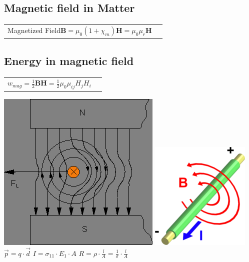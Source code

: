 		\subsection{Magnetic field in Matter}
		\begin{tabularx}{\columnwidth}{lX}
			Magnetized Field$\mathbf{B} = \mu_0(1+ \chi_m)\mathbf{H} =  \mu_0\mu_r\mathbf{H}$			
		\end{tabularx}
		
		\subsection{Energy in magnetic field}
		\begin{tabularx}{\columnwidth}{lX}
			$w_{mag} = \frac{1}{2}\mathbf{BH}= \frac{1}{2}\mu_0\mu_{ij}H_j H_i$\\
		\end{tabularx}

				\includegraphics[scale=0.5]{images/DrahtZwischenPolen.png}
				\includegraphics[scale=0.5]{images/B-Feld.png}
			$ \vec{p}=q\cdot\vec{d} $
			$ I = \sigma_{11} \cdot E_1 \cdot A $
		$ R=\rho\cdot\frac{l}{A}=\frac{1}{\sigma} \cdot\frac{l}{A}$\\

